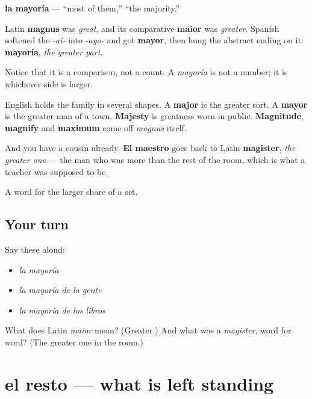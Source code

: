 \begin{cousinweb}
\textbf{la mayoría} — \textquotedblleft{}most of them,\textquotedblright{} \textquotedblleft{}the majority.\textquotedblright{}

Latin \textbf{magnus} was \emph{great}, and its comparative \textbf{maior} was \emph{greater}. Spanish softened the \emph{-ai-} into \emph{-ayo-} and got \textbf{mayor}, then hung the abstract ending on it: \textbf{mayoría}, \emph{the greater part}.

Notice that it is a comparison, not a count. A \emph{mayoría} is not a number; it is whichever side is larger.

English holds the family in several shapes. A \textbf{major} is the greater sort. A \textbf{mayor} is the greater man of a town. \textbf{Majesty} is greatness worn in public. \textbf{Magnitude}, \textbf{magnify} and \textbf{maximum} come off \emph{magnus} itself.

And you have a cousin already. \textbf{El maestro} goes back to Latin \textbf{magister}, \emph{the greater one} — the man who was more than the rest of the room, which is what a teacher was supposed to be.
\end{cousinweb}

\begin{grammarlens}[title={What you've built}]
A word for the larger share of a set.
\end{grammarlens}

\subsection*{Your turn}
Say these aloud:

\begin{itemize}
\raggedright
  \item \emph{la mayoría}
  \item \emph{la mayoría de la gente}
  \item \emph{la mayoría de los libros}
\end{itemize}

\begin{tcolorbox}[breakable,colback=teal!4,colframe=teal!35!black,title={Before you move on}]
What does Latin \emph{maior} mean? (Greater.) And what was a \emph{magister}, word for word? (The greater one in the room.)
\end{tcolorbox}
\section[el resto]{el resto — what is left standing}

